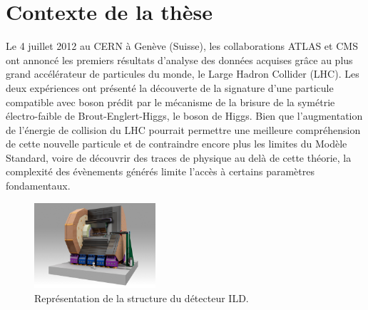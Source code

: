 \documentclass[a4papper, 10pt]{article}
\title{\textbf{Intelligent detection layers for advanced tracking in high-energy physics} \\ \large \vskip 1ex
        Résumé de la thèse de doctorat}
\author{Benjamin Boitrelle \\ 
        Sous la direction de : \\
        Jérôme Baudot : Directeur de thèse à l'Université de Strasbourg \\
        Ingrid Maria Gregor : Encadrante au laboratoire d'accueil au DESY de Hambourg}
\date{}
\begin{document}
    \maketitle


  \section{Contexte de la thèse}

  Le 4 juillet 2012 au CERN à Genève (Suisse), les collaborations ATLAS et CMS ont annoncé les premiers résultats d'analyse des données acquises grâce au plus grand accélérateur de particules du monde, le Large Hadron Collider (LHC)\cite{Aad2012}\cite{Chatrchyan2012}. 
  Les deux expériences ont présenté la découverte de la signature d'une particule compatible avec boson prédit par le mécanisme de la brisure de la symétrie électro-faible de Brout-Englert-Higgs, le boson de Higgs.
  Bien que l'augmentation de l'énergie de collision du LHC pourrait permettre une meilleure compréhension de cette nouvelle particule et de contraindre encore plus les limites du Modèle Standard, voire de découvrir des traces de physique au delà de cette théorie, la complexité des évènements générés limite l'accès à certains paramètres fondamentaux.
  
  \begin{figure}[!h]
    \centering
    \includegraphics[width = 0.4\textwidth]{Pictures/ILD.jpg}
    \caption{Représentation de la structure du détecteur ILD.}
    \label{fig:ILD}
  \end{figure}
 
\end{document}
